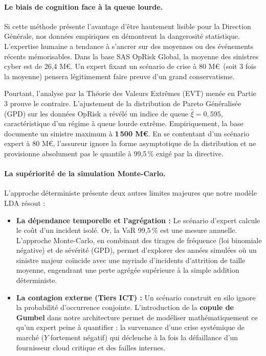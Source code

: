\documentclass[11pt,a4paper]{article}
\theoremstyle{navystyle}
\theoremstyle{navydef}
\begin{document}
\paragraph{Le biais de cognition face à la queue lourde.} Si cette méthode présente l'avantage d'être hautement \og lisible\fg{} pour la Direction Générale, nos données empiriques en démontrent la dangerosité statistique. L'expertise humaine a tendance à s'ancrer sur des moyennes ou des événements récents mémorisables. Dans la base SAS OpRisk Global, la moyenne des sinistres cyber est de 26,4 M\euro. Un expert fixant un scénario de crise à 80 M\euro\ (soit 3 fois la moyenne) pensera légitimement faire preuve d'un grand conservatisme.

Pourtant, l'analyse par la Théorie des Valeurs Extrêmes (EVT) menée en Partie 3 prouve le contraire. L'ajustement de la distribution de Pareto Généralisée (GPD) sur les données OpRisk a révélé un indice de queue $\hat{\xi} = 0{,}595$, caractéristique d'un régime à queue lourde extrême. Empiriquement, la base documente un sinistre maximum à \textbf{1\,500 M\euro}. En se contentant d'un scénario expert à 80 M\euro, l'assureur ignore la forme asymptotique de la distribution et ne provisionne absolument pas le quantile à 99,5\,\% exigé par la directive.

\paragraph{La supériorité de la simulation Monte-Carlo.} L'approche déterministe présente deux autres limites majeures que notre modèle LDA résout :
\begin{itemize}
    \item \textbf{La dépendance temporelle et l'agrégation :} Le scénario d'expert calcule le coût d'un incident isolé. Or, la VaR 99,5\,\% est une mesure annuelle. L'approche Monte-Carlo, en combinant des tirages de fréquence (loi binomiale négative) et de sévérité (GPD), permet d'explorer des années simulées où un sinistre majeur coïncide avec une myriade d'incidents d'attrition de taille moyenne, engendrant une perte agrégée supérieure à la simple addition déterministe.
    \item \textbf{La contagion externe (Tiers ICT) :} Un scénario construit en silo ignore la probabilité d'occurrence conjointe. L'introduction de la \textbf{copule de Gumbel} dans notre architecture permet de modéliser mathématiquement ce qu'un expert peine à quantifier : la survenance d'une crise systémique de marché ($Y$ fortement négatif) qui déclenche à la fois la défaillance d'un fournisseur cloud critique et des failles internes. 
\end{itemize}
\end{document}
